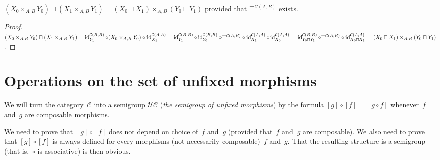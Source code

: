 \begin{prop}
$(X_0\times_{A,B}Y_0)\sqcap(X_1\times_{A,B}Y_1)=
(X_0\sqcap X_1)\times_{A,B}(Y_0\sqcap Y_1)$
provided that $\top^{\mathcal{C}(A,B)}$ exists.
\end{prop}

\begin{proof}
$(X_0\times_{A,B}Y_0)\sqcap(X_1\times_{A,B}Y_1)=
\operatorname{id}^{\mathcal{C}(B,B)}_{Y_1}\circ(X_0\times_{A,B}Y_0)\circ
\operatorname{id}^{\mathcal{C}(A,A)}_{X_1}=
\operatorname{id}^{\mathcal{C}(B,B)}_{Y_1}\circ
\operatorname{id}^{\mathcal{C}(B,B)}_{Y_0}\circ
\top^{\mathcal{C}(A,B)}\circ
\operatorname{id}^{\mathcal{C}(A,A)}_{X_1}\circ
\operatorname{id}^{\mathcal{C}(A,A)}_{X_0}=
\operatorname{id}^{\mathcal{C}(B,B)}_{Y_0\sqcap Y_1}\circ
\top^{\mathcal{C}(A,B)}\circ
\operatorname{id}^{\mathcal{C}(A,A)}_{X_0\sqcap X_1}=
(X_0\sqcap X_1)\times_{A,B}(Y_0\sqcap Y_1)$.
\end{proof}

\section{Operations on the set of unfixed morphisms}

\begin{defn}
We will turn the category~$\mathcal{C}$ into a semigroup
$\mathcal{U}\mathcal{C}$
(\emph{the semigroup of unfixed morphisms}) by
the formula $[g]\circ[f] = [g\circ f]$ whenever~$f$ and~$g$
are composable morphisms.
\end{defn}

We need to prove that $[g]\circ[f]$ does not depend on
choice of~$f$ and~$g$ (provided that~$f$ and~$g$
are composable). We also need to prove that $[g]\circ[f]$
is always defined for every morphisms (not necessarily
composable)~$f$ and~$g$. That the resulting structure is
a semigroup (that is,~$\circ$ is associative) is then
obvious.

